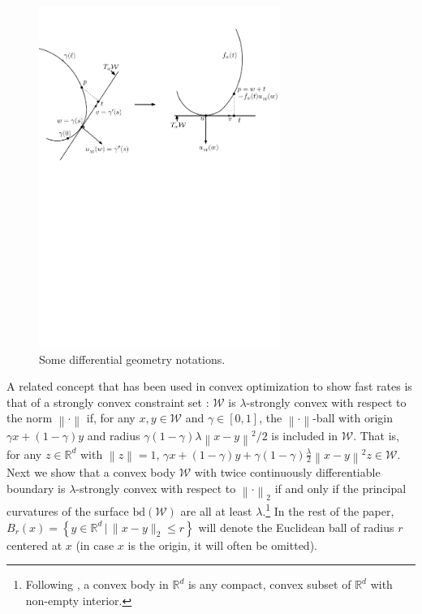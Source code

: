 \documentclass[english]{article}
\newcommand{\cW}{\mathcal{W}}
\newcommand{\R}{\mathbb{R}}
\newcommand{\set}[2]{\left\{#1 \,\vert\, #2 \right\}}
\newcommand{\norm}[1]{\left\| #1 \right\|}
\newcommand{\bd}{\mathrm{bd}}
\begin{document}
\begin{figure}[th]
	\centering
	\includegraphics[width=0.7\textwidth]{figures/DiffGeo}
	\caption{Some differential geometry notations. \label{fig:diffgeo}}
\end{figure}

A related concept that has been used in convex optimization to show fast rates is that of a strongly convex constraint set \citep{LePo66,garber2014faster}:
$\cW$ is $\lambda$-strongly convex with respect to the norm $\norm{\cdot}$ if, for  any $x,y\in \cW$ and $\gamma\in [0,1]$, the $\norm{\cdot}$-ball with origin $\gamma x + (1-\gamma) y$ and radius $\gamma(1-\gamma) \lambda \norm{x-y}^2/2 $ is included in $ \cW$.
That is, for any $z\in \R^d$ with $\norm{z}=1$, $\gamma x + (1-\gamma) y + \gamma(1-\gamma) \frac{\lambda}{2} \norm{x-y}^2 z\in \cW$.
Next we show that a  convex body
$\cW$ with twice continuously differentiable boundary is $\lambda$-strongly convex with respect to $\norm{\cdot}_2$ if and only if the principal curvatures of the surface $\bd(\cW)$ are all at least $\lambda$.\footnote{Following \citet{Sch14:ConvexBodies}, a convex body in $\R^d$ is any compact, convex subset of $\R^d$ with non-empty interior.}
In the rest of the paper, $B_r(x)=\set{y \in \R^d}{ \|x-y\|_2 \le r}$ will denote the Euclidean ball of radius $r$ centered at $x$ (in case $x$ is the origin, it will often be omitted).
\end{document}
